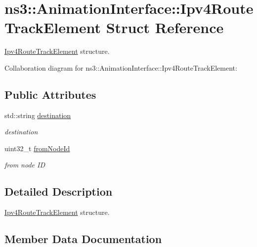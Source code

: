 \hypertarget{structns3_1_1AnimationInterface_1_1Ipv4RouteTrackElement}{}\section{ns3\+:\+:Animation\+Interface\+:\+:Ipv4\+Route\+Track\+Element Struct Reference}
\label{structns3_1_1AnimationInterface_1_1Ipv4RouteTrackElement}


\hyperlink{structns3_1_1AnimationInterface_1_1Ipv4RouteTrackElement}{Ipv4\+Route\+Track\+Element} structure.  




Collaboration diagram for ns3\+:\+:Animation\+Interface\+:\+:Ipv4\+Route\+Track\+Element\+:
\subsection*{Public Attributes}
\begin{DoxyCompactItemize}
\item 
std\+::string \hyperlink{structns3_1_1AnimationInterface_1_1Ipv4RouteTrackElement_aa94a82342e6900fbe19427c56f134181}{destination}
\begin{DoxyCompactList}\small\item\em destination \end{DoxyCompactList}\item 
uint32\+\_\+t \hyperlink{structns3_1_1AnimationInterface_1_1Ipv4RouteTrackElement_a09d9702792a65e22bc4933962ade30be}{from\+Node\+Id}
\begin{DoxyCompactList}\small\item\em from node ID \end{DoxyCompactList}\end{DoxyCompactItemize}


\subsection{Detailed Description}
\hyperlink{structns3_1_1AnimationInterface_1_1Ipv4RouteTrackElement}{Ipv4\+Route\+Track\+Element} structure. 

\subsection{Member Data Documentation}
